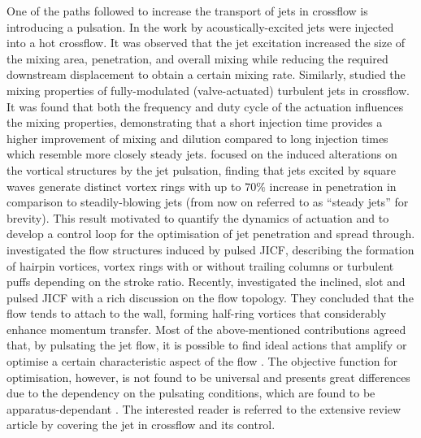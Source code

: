 One of the paths followed to increase the transport of jets in crossflow is introducing a pulsation.
In the work by \citet{vermeulen1992mixing} acoustically-excited jets were injected into a hot crossflow. It was observed that the jet excitation increased the size of the mixing area, penetration, and overall mixing while reducing the required downstream displacement to obtain a certain mixing rate. 
Similarly, \citet{johari1999penetration} studied the mixing properties of fully-modulated (valve-actuated) turbulent jets in crossflow. It was found that both the frequency and duty cycle of the actuation influences the mixing properties, demonstrating that a short injection time provides a higher improvement of mixing and dilution compared to long injection times which resemble more closely steady jets.
\citet{eroglu2001structure} focused on the induced alterations on the vortical structures by the jet pulsation, finding that jets excited by square waves generate distinct vortex rings with up to $70\%$ increase in penetration in comparison to steadily-blowing jets (from now on referred to as ``steady jets'' for brevity). This result motivated \citet{MCLOSKEY2002} to quantify the dynamics of actuation and to develop a control loop for the optimisation of jet penetration and spread through. \citet{Johari2006scaling} investigated the flow structures induced by pulsed JICF, describing the formation of hairpin vortices, vortex rings with or without trailing columns or turbulent puffs depending on the stroke ratio. Recently, \citet{Steinfurth2021pulsedjet} investigated the inclined, slot and pulsed JICF with a rich discussion on the flow topology. They concluded that the flow tends to attach to the wall, forming half-ring vortices that considerably enhance momentum transfer.
Most of the above-mentioned contributions agreed that, by pulsating the jet flow, it is possible to find ideal actions that amplify or optimise a certain characteristic aspect of the flow \citep{shapiro2006optimization}. The objective function for optimisation, however, is not found to be universal and presents great differences due to the dependency on the pulsating conditions, which are found to be apparatus-dependant \citep{MCLOSKEY2002}. The interested reader is referred to the extensive review article by \citet{karagozian2010transverse} covering the jet in crossflow and its control.

